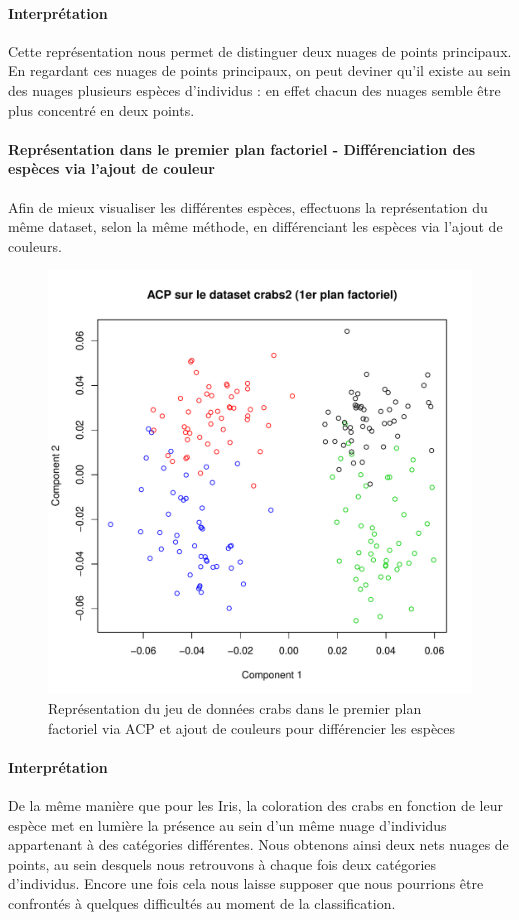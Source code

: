 \documentclass{report}
\begin{document}
\paragraph{Interprétation}
Cette représentation nous permet de distinguer deux nuages de points principaux. En regardant ces nuages de points principaux, on peut deviner qu'il existe au sein des nuages plusieurs espèces d'individus : en effet chacun des nuages semble être plus concentré en deux points.
\paragraph{Représentation dans le premier plan factoriel - Différenciation des espèces via l'ajout de couleur}
Afin de mieux visualiser les différentes espèces, effectuons la représentation du même dataset, selon la même méthode, en différenciant les espèces via l'ajout de couleurs.
\begin{figure}[ht!]
\begin{center}
    \includegraphics[width=\textwidth]{../plots/E1Q2_2_ACPcrabs.pdf}
    \caption{Représentation du jeu de données crabs dans le premier plan factoriel via ACP et ajout de couleurs pour différencier les espèces}
\end{center}
\end{figure}
\paragraph{Interprétation}
De la même manière que pour les Iris, la coloration des crabs en fonction de leur espèce met en lumière la présence au sein d'un même nuage d'individus appartenant à des catégories différentes. Nous obtenons ainsi deux nets nuages de points, au sein desquels nous retrouvons à chaque fois deux catégories d'individus. Encore une fois cela nous laisse supposer que nous pourrions être confrontés à quelques difficultés au moment de la classification.
\newpage
\end{document}
